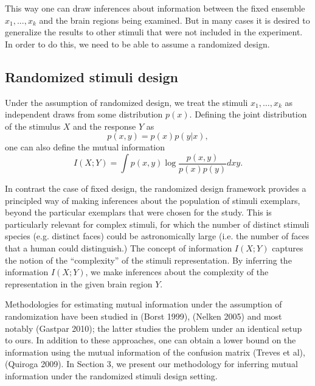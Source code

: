 \documentclass[12pt]{article}
\begin{document}
This way one can draw inferences about information between the fixed
ensemble $x_1,...,x_k$ and the brain regions being examined.  But in
many cases it is desired to generalize the results to other stimuli
that were not included in the experiment.  In order to do this, we
need to be able to assume a randomized design.

\subsection{Randomized stimuli design}

Under the assumption of randomized design, we treat the stimuli
$x_1,\hdots, x_k$ as independent draws from some distribution $p(x)$.
Defining the joint distribution of the stimulus $X$ and the response
$Y$ as
\[
p(x, y) = p(x) p(y|x),
\]
one can also define the mutual information
\[
I(X; Y) = \int p(x, y) \log \frac{p(x, y)}{p(x) p(y)} dxy.
\]

In contrast the case of fixed design, the randomized design framework
provides a principled way of making inferences about the population of
stimuli exemplars, beyond the particular exemplars that were chosen
for the study.  This is particularly relevant for complex stimuli, for
which the number of distinct stimuli species (e.g. distinct faces)
could be astronomically large (i.e. the number of faces that a human
could distinguish.)  The concept of information $I(X; Y)$ captures the
notion of the ``complexity'' of the stimuli representation.  By
inferring the information $I(X; Y)$, we make inferences about the
complexity of the representation in the given brain region $Y$.

Methodologies for estimating mutual information under the assumption
of randomization have been studied in (Borst 1999), (Nelken 2005) and
most notably (Gastpar 2010); the latter studies the problem under an
identical setup to ours.  In addition to these approaches, one can
obtain a lower bound on the information using the mutual information
of the confusion matrix (Treves et al), (Quiroga 2009).  In Section 3,
we present our methodology for inferring mutual information under the
randomized stimuli design setting.
\end{document}
